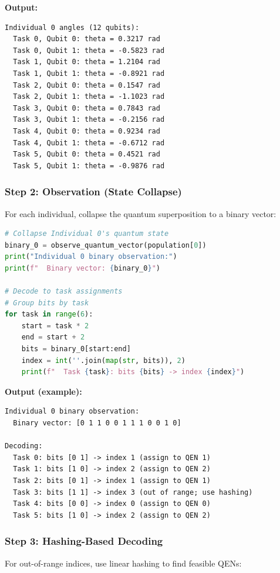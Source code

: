 \documentclass[12pt,a4paper]{article}
\begin{document}
\textbf{Output:}
\begin{verbatim}
Individual 0 angles (12 qubits):
  Task 0, Qubit 0: theta = 0.3217 rad
  Task 0, Qubit 1: theta = -0.5823 rad
  Task 1, Qubit 0: theta = 1.2104 rad
  Task 1, Qubit 1: theta = -0.8921 rad
  Task 2, Qubit 0: theta = 0.1547 rad
  Task 2, Qubit 1: theta = -1.1023 rad
  Task 3, Qubit 0: theta = 0.7843 rad
  Task 3, Qubit 1: theta = -0.2156 rad
  Task 4, Qubit 0: theta = 0.9234 rad
  Task 4, Qubit 1: theta = -0.6712 rad
  Task 5, Qubit 0: theta = 0.4521 rad
  Task 5, Qubit 1: theta = -0.9876 rad
\end{verbatim}

\subsubsection{Step 2: Observation (State Collapse)}

For each individual, collapse the quantum superposition to a binary vector:

\begin{lstlisting}[language=Python, caption=Observation for Individual 0]
# Collapse Individual 0's quantum state
binary_0 = observe_quantum_vector(population[0])
print("Individual 0 binary observation:")
print(f"  Binary vector: {binary_0}")

# Decode to task assignments
# Group bits by task
for task in range(6):
    start = task * 2
    end = start + 2
    bits = binary_0[start:end]
    index = int(''.join(map(str, bits)), 2)
    print(f"  Task {task}: bits {bits} -> index {index}")
\end{lstlisting}

\textbf{Output (example):}
\begin{verbatim}
Individual 0 binary observation:
  Binary vector: [0 1 1 0 0 1 1 1 0 0 1 0]

Decoding:
  Task 0: bits [0 1] -> index 1 (assign to QEN 1)
  Task 1: bits [1 0] -> index 2 (assign to QEN 2)
  Task 2: bits [0 1] -> index 1 (assign to QEN 1)
  Task 3: bits [1 1] -> index 3 (out of range; use hashing)
  Task 4: bits [0 0] -> index 0 (assign to QEN 0)
  Task 5: bits [1 0] -> index 2 (assign to QEN 2)
\end{verbatim}

\subsubsection{Step 3: Hashing-Based Decoding}

For out-of-range indices, use linear hashing to find feasible QENs:
\end{document}
